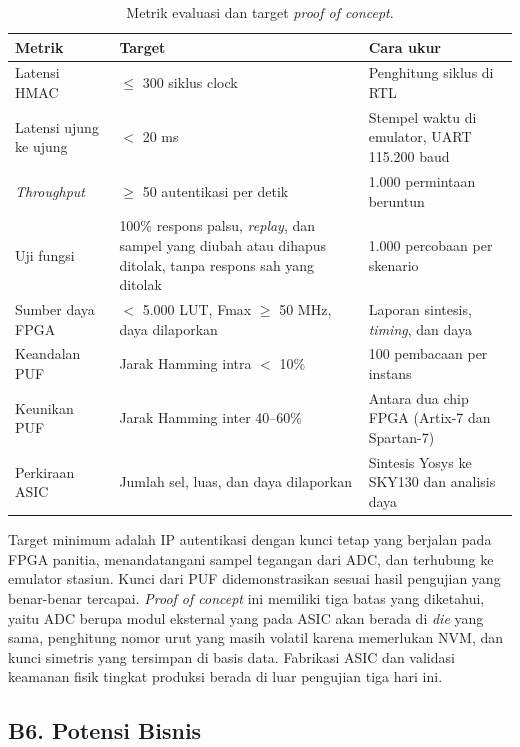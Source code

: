 \documentclass[11pt,a4paper]{article}
\newcommand{\hdr}[1]{\cellcolor{hdrgray}\textbf{#1}}
\begin{document}
\begin{table}[H]
  \centering
  \small
  \caption{Metrik evaluasi dan target \textit{proof of concept}.}
  \label{tab:metrik}
  \begin{tabularx}{\linewidth}{|L{3.4cm}|Y|L{4.6cm}|}
    \hline
    \hdr{Metrik} & \hdr{Target} & \hdr{Cara ukur} \\ \hline
    Latensi HMAC & $\le$ 300 siklus clock & Penghitung siklus di RTL \\ \hline
    Latensi ujung ke ujung & $<$ 20 ms & Stempel waktu di emulator, UART 115.200 baud \\ \hline
    \textit{Throughput} & $\ge$ 50 autentikasi per detik & 1.000 permintaan beruntun \\ \hline
    Uji fungsi & 100\% respons palsu, \textit{replay}, dan sampel yang diubah atau dihapus ditolak, tanpa respons sah yang ditolak & 1.000 percobaan per skenario \\ \hline
    Sumber daya FPGA & $<$ 5.000 LUT, Fmax $\ge$ 50 MHz, daya dilaporkan & Laporan sintesis, \textit{timing}, dan daya \\ \hline
    Keandalan PUF & Jarak Hamming intra $<$ 10\% & 100 pembacaan per instans \\ \hline
    Keunikan PUF & Jarak Hamming inter 40--60\% & Antara dua chip FPGA (Artix-7 dan Spartan-7) \\ \hline
    Perkiraan ASIC & Jumlah sel, luas, dan daya dilaporkan & Sintesis Yosys ke SKY130 dan analisis daya \\ \hline
  \end{tabularx}
\end{table}

Target minimum adalah IP autentikasi dengan kunci tetap yang berjalan pada FPGA panitia, menandatangani sampel tegangan dari ADC, dan terhubung ke emulator stasiun. Kunci dari PUF didemonstrasikan sesuai hasil pengujian yang benar-benar tercapai. \textit{Proof of concept} ini memiliki tiga batas yang diketahui, yaitu ADC berupa modul eksternal yang pada ASIC akan berada di \textit{die} yang sama, penghitung nomor urut yang masih volatil karena memerlukan NVM, dan kunci simetris yang tersimpan di basis data. Fabrikasi ASIC dan validasi keamanan fisik tingkat produksi berada di luar pengujian tiga hari ini.

\subsection{B6. Potensi Bisnis}
\end{document}
